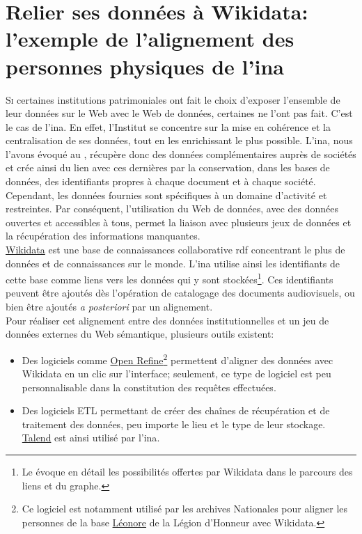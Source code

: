 \chapter{\label{II-C}Relier ses données à Wikidata: l'exemple de l'alignement des personnes physiques de l'\ac{ina}}

\lettrine{S}i certaines institutions patrimoniales ont fait le choix d'exposer l'ensemble de leur données sur le Web avec le Web de données, certaines ne l'ont pas fait. C'est le cas de l'\ac{ina}. En effet, l'Institut se concentre sur la mise en cohérence et la centralisation de ses données, tout en les enrichissant le plus possible. L'\ac{ina}, nous l'avons évoqué au , récupère donc des données complémentaires auprès de sociétés et crée ainsi du lien avec ces dernières par la conservation, dans les bases de données, des identifiants propres à chaque document et à chaque société. Cependant, les données fournies sont spécifiques à un domaine d'activité et restreintes. Par conséquent, l'utilisation du Web de données, avec des données ouvertes et accessibles à tous, permet la liaison avec plusieurs jeux de données et la récupération des informations manquantes.\\

\href{https://www.wikidata.org/}{Wikidata} est une base de connaissances collaborative \ac{rdf} concentrant le plus de données et de connaissances sur le monde. L'\ac{ina} utilise ainsi les identifiants de cette base comme liens vers les données qui y sont stockées\footnote{Le  évoque en détail les possibilités offertes par Wikidata dans le parcours des liens et du graphe.}. Ces identifiants peuvent être ajoutés dès l'opération de catalogage des documents audiovisuels, ou bien être ajoutés \textit{a posteriori} par un alignement.\\

Pour réaliser cet alignement entre des données institutionnelles et un jeu de données externes du Web sémantique, plusieurs outils existent:
\begin{itemize}
	\item Des logiciels comme \href{https://openrefine.org/}{Open Refine}\footnote{Ce logiciel est notamment utilisé par les archives Nationales pour aligner les personnes de la base \href{http://www2.culture.gouv.fr/documentation/leonore/}{Léonore} de la Légion d'Honneur avec Wikidata.} permettent d'aligner des données avec Wikidata en un clic sur l'interface; seulement, ce type de logiciel est peu personnalisable dans la constitution des requêtes effectuées.
	\item Des logiciels ETL permettant de créer des chaînes de récupération et de traitement des données, peu importe le lieu et le type de leur stockage. \href{https://www.talend.com/fr/}{Talend} est ainsi utilisé par l'\ac{ina}.
\end{itemize}
\medskip

